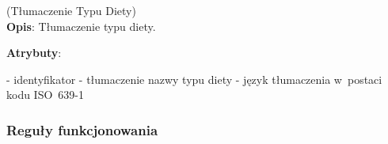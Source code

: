 \begin{enumerate}[label={\textbf{KAT/2/\protect\twodigits{\theenumi}}}, wide, labelwidth=!, labelindent=0pt, labelsep=0pt, series=reqs]
    \label{kat:DietTypeTranslation} (Tłumaczenie Typu Diety)\\
    \indent\textbf{Opis}: Tłumaczenie typu diety.
    \par
    \textbf{Atrybuty}:
    \begin{itemize}[series=atr, wide, align=left, leftmargin=190pt]
        \label{kat:DietTypeTranslation:id}- identyfikator
        \label{kat:DietTypeTranslation:translation}- tłumaczenie nazwy typu diety
        \label{kat:DietTypeTranslation:language}- język tłumaczenia w~postaci kodu ISO~639-1
    \end{itemize}

\end{enumerate}

\subsubsection{Reguły funkcjonowania}\label{subsubsec:database:products:functionalRules}

